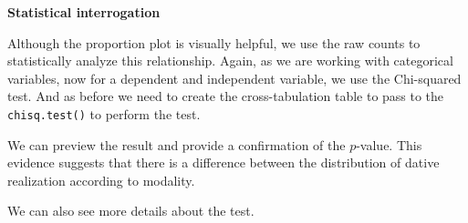 \documentclass[
]{article}
\newenvironment{Shaded}{\begin{snugshade}}{\end{snugshade}}
\newcommand{\AttributeTok}[1]{\textcolor[rgb]{0.77,0.63,0.00}{#1}}
\newcommand{\CommentTok}[1]{\textcolor[rgb]{0.56,0.35,0.01}{\textit{#1}}}
\newcommand{\DecValTok}[1]{\textcolor[rgb]{0.00,0.00,0.81}{#1}}
\newcommand{\FunctionTok}[1]{\textcolor[rgb]{0.00,0.00,0.00}{#1}}
\newcommand{\NormalTok}[1]{#1}
\newcommand{\OtherTok}[1]{\textcolor[rgb]{0.56,0.35,0.01}{#1}}
\newcommand{\SpecialCharTok}[1]{\textcolor[rgb]{0.00,0.00,0.00}{#1}}
\begin{document}
\textbf{Statistical interrogation}

Although the proportion plot is visually helpful, we use the raw counts to statistically analyze this relationship. Again, as we are working with categorical variables, now for a dependent and independent variable, we use the Chi-squared test. And as before we need to create the cross-tabulation table to pass to the \texttt{chisq.test()} to perform the test.

\begin{Shaded}
\end{Shaded}

We can preview the result and provide a confirmation of the \(p\)-value. This evidence suggests that there is a difference between the distribution of dative realization according to modality.

We can also see more details about the test.
\end{document}
